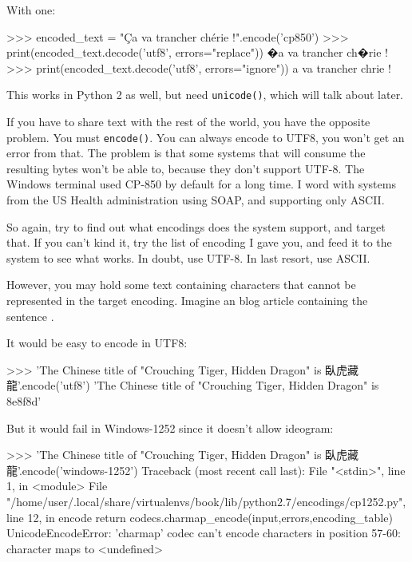 With one:

\begin{py3}
>>> encoded_text = "Ça va trancher chérie !".encode('cp850')
>>> print(encoded_text.decode('utf8', errors="replace"))
�a va trancher ch�rie !
>>> print(encoded_text.decode('utf8', errors="ignore"))
a va trancher chrie !
\end{py3}

This works in Python 2 as well, but need \lstinline{unicode()}, which will talk about later.

If you have to share text with the rest of the world, you have the opposite problem. You must \lstinline{encode()}. You can always encode to UTF8, you won't get an error from that. The problem is that some systems that will consume the resulting bytes won't be able to, because they don't support UTF-8. The Windows terminal used CP-850 by default for a long time. I word with systems from the US Health administration using SOAP, and supporting only ASCII.

So again, try to find out what encodings does the system support, and target that. If you can't kind it, try the list of encoding I gave you, and feed it to the system to see what works. In doubt, use UTF-8. In last resort, use ASCII.

However, you may hold some text containing characters that cannot be represented in the target encoding. Imagine an blog article containing the sentence .

It would be easy to encode in UTF8:

\begin{py3}
>>> 'The Chinese title of "Crouching Tiger, Hidden Dragon" is 臥虎藏龍'.encode('utf8')
'The Chinese title of "Crouching Tiger, Hidden Dragon" is \x8e\x8f\xbe\x8d'
\end{py3}

But it would fail in Windows-1252 since it doesn't allow ideogram:

\begin{py3}
>>> 'The Chinese title of "Crouching Tiger, Hidden Dragon" is 臥虎藏龍'.encode('windows-1252')
Traceback (most recent call last):
    File "<stdin>", line 1, in <module>
    File "/home/user/.local/share/virtualenvs/book/lib/python2.7/encodings/cp1252.py", line 12, in encode
    return codecs.charmap_encode(input,errors,encoding_table)
UnicodeEncodeError: 'charmap' codec can't encode characters in position 57-60: character maps to <undefined>
\end{py3}

